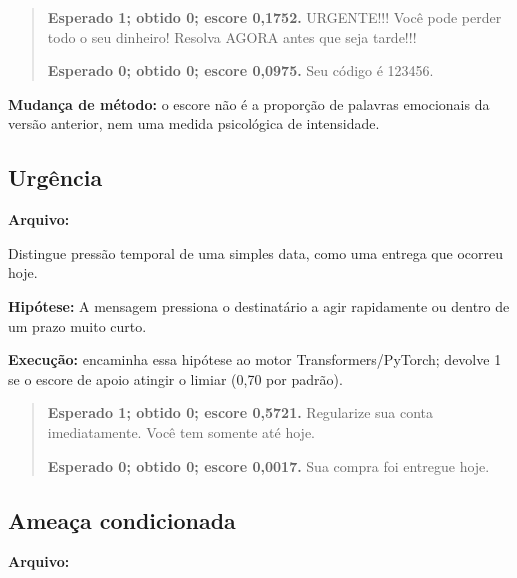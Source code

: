 \begin{quote}\small

\textbf{Esperado 1; obtido 0; escore 0,1752.} URGENTE!!! Você pode perder todo o seu dinheiro! Resolva AGORA antes que seja tarde!!!\par

\textbf{Esperado 0; obtido 0; escore 0,0975.} Seu código é 123456.\par

\end{quote}

\textbf{Mudança de método:} o escore não é a proporção de palavras emocionais da versão anterior, nem uma medida psicológica de intensidade.

\clearpage

\subsection{Urgência}

\textbf{Arquivo:} \par

Distingue pressão temporal de uma simples data, como uma entrega que ocorreu hoje.

\textbf{Hipótese:} A mensagem pressiona o destinatário a agir rapidamente ou dentro de um prazo muito curto.

\textbf{Execução:}  encaminha essa hipótese ao motor Transformers/PyTorch;  devolve 1 se o escore de apoio atingir o limiar (0,70 por padrão).

\begin{quote}\small

\textbf{Esperado 1; obtido 0; escore 0,5721.} Regularize sua conta imediatamente. Você tem somente até hoje.\par

\textbf{Esperado 0; obtido 0; escore 0,0017.} Sua compra foi entregue hoje.\par

\end{quote}

\subsection{Ameaça condicionada}

\textbf{Arquivo:} \par

